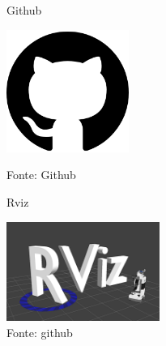 \documentclass[../poliXuniversity_hospital_(USP)_report.tex]{subfiles}
\begin{document}
\begin{figure}[h]
\centering
    \begin{minipage}{0.5\textwidth}
        \centering
        \caption{Github}
        \centering %
        \includegraphics[width=4cm]{images/logo_git.png}
        \caption*{Fonte: Github}
        \label{figura: Github}
        
    \end{minipage}\hfill
    \begin{minipage}{0.5\textwidth}
    
        \centering
        \caption{Rviz}
        \centering %
        \includegraphics[width=5cm]{images/logo_rviz.png}
        \caption*{Fonte: github}
        \label{figura:Rviz}
        
    \end{minipage}\hfill
\end{figure}
\end{document}
